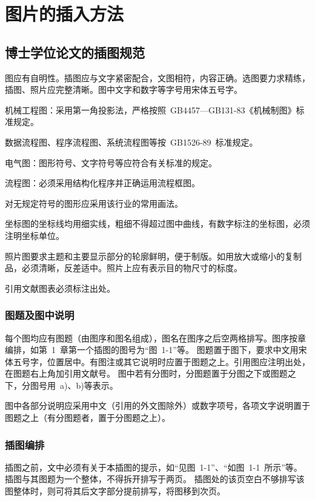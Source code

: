 
\chapter{图片的插入方法}

\section{博士学位论文的插图规范}

图应有自明性。插图应与文字紧密配合，文图相符，内容正确。选图要力求精练，插图、照片应完整清晰。图中文字和数字等字号用宋体五号字。

机械工程图：采用第一角投影法，严格按照~GB4457---GB131-83《机械制图》标准规定。

数据流程图、程序流程图、系统流程图等按~GB1526-89~标准规定。

电气图：图形符号、文字符号等应符合有关标准的规定。

流程图：必须采用结构化程序并正确运用流程框图。

对无规定符号的图形应采用该行业的常用画法。

坐标图的坐标线均用细实线，粗细不得超过图中曲线，有数字标注的坐标图，必须注明坐标单位。

照片图要求主题和主要显示部分的轮廓鲜明，便于制版。如用放大或缩小的复制品，必须清晰，反差适中。照片上应有表示目的物尺寸的标度。

引用文献图表必须标注出处。


\subsection{图题及图中说明}
每个图均应有图题（由图序和图名组成），图名在图序之后空两格排写。图序按章编排，如第~1~章第一个插图的图号为“图~1-1”等。
图题置于图下，要求中文用宋体五号字，位置居中。有图注或其它说明时应置于图题之上。引用图应注明出处，在图题右上角加引用文献号。
图中若有分图时，分图题置于分图之下或图题之下，分图号用~a)、b)等表示。

图中各部分说明应采用中文（引用的外文图除外）或数字项号，各项文字说明置于图题之上（有分图题者，置于分图题之上）。

\subsection{插图编排}
插图之前，文中必须有关于本插图的提示，如“见图~1-1”、“如图~1-1~所示”等。插图与其图题为一个整体，不得拆开排写于两页。
插图处的该页空白不够排写该图整体时，则可将其后文字部分提前排写，将图移到次页。

